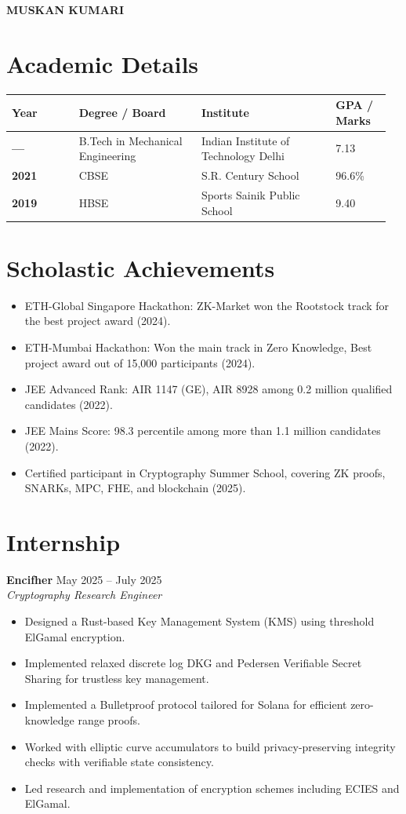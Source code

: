 \documentclass[11pt,a4paper]{article}
\newcommand{\resumeSubheading}[4]{
  \textbf{#1} \hfill #2\\
  \textit{#3} \hfill \textit{#4}
}
\begin{document}
{\LARGE \textbf{MUSKAN KUMARI}}\\[4pt]

\section*{Academic Details}
\begin{tabular}{>{\bfseries}p{0.17\linewidth} p{0.31\linewidth} p{0.34\linewidth} p{0.14\linewidth}}
Year & Degree / Board & Institute & GPA / Marks \\
\hline
--- & B.Tech in Mechanical Engineering & Indian Institute of Technology Delhi & 7.13 \\
2021 & CBSE & S.R. Century School & 96.6\% \\
2019 & HBSE & Sports Sainik Public School & 9.40 \\
\end{tabular}

\section*{Scholastic Achievements}
\begin{itemize}
  \item ETH-Global Singapore Hackathon: ZK-Market won the Rootstock track for the best project award (2024).
  \item ETH-Mumbai Hackathon: Won the main track in Zero Knowledge, Best project award out of 15,000 participants (2024).
  \item JEE Advanced Rank: AIR 1147 (GE), AIR 8928 among 0.2 million qualified candidates (2022).
  \item JEE Mains Score: 98.3 percentile among more than 1.1 million candidates (2022).
  \item Certified participant in Cryptography Summer School, covering ZK proofs, SNARKs, MPC, FHE, and blockchain (2025).
\end{itemize}

\section*{Internship}
\resumeSubheading{Encifher}{May 2025 -- July 2025}{Cryptography Research Engineer}{}
\begin{itemize}
  \item Designed a Rust-based Key Management System (KMS) using threshold ElGamal encryption.
  \item Implemented relaxed discrete log DKG and Pedersen Verifiable Secret Sharing for trustless key management.
  \item Implemented a Bulletproof protocol tailored for Solana for efficient zero-knowledge range proofs.
  \item Worked with elliptic curve accumulators to build privacy-preserving integrity checks with verifiable state consistency.
  \item Led research and implementation of encryption schemes including ECIES and ElGamal.
\end{itemize}
\end{document}
